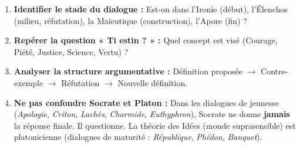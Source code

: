 \documentclass[11pt]{article}
\begin{document}
\begin{methode}
\begin{enumerate}
    \item \textbf{Identifier le stade du dialogue :} Est-on dans l'Ironie (début), l'Élenchos (milieu, réfutation), la Maïeutique (construction), l'Apore (fin) ?
    \item \textbf{Repérer la question « Ti estin ? » :} Quel concept est visé (Courage, Piété, Justice, Science, Vertu) ?
    \item \textbf{Analyser la structure argumentative :} Définition proposée $\rightarrow$ Contre-exemple $\rightarrow$ Réfutation $\rightarrow$ Nouvelle définition.
    \item \textbf{Ne pas confondre Socrate et Platon :} Dans les dialogues de jeunesse (\emph{Apologie}, \emph{Criton}, \emph{Lachès}, \emph{Charmide}, \emph{Euthyphron}), Socrate ne donne \textbf{jamais} la réponse finale. Il questionne. La théorie des Idées (monde suprasensible) est platonicienne (dialogues de maturité : \emph{République}, \emph{Phédon}, \emph{Banquet}).
\end{enumerate}
\end{methode}
\end{document}
